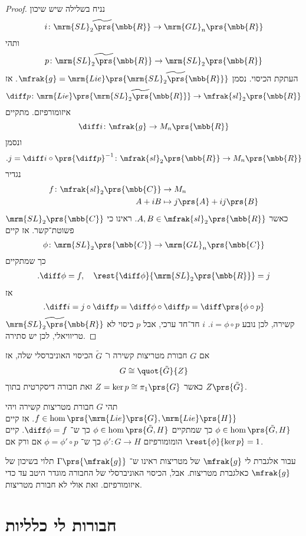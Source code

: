 \documentclass[10pt, twoside]{book}
\newcommand{\Lie}{\mrm{Lie}}
\begin{document}
\begin{proof}
נניח בשלילה שיש שיכון
\[i \colon \widetilde{\mrm{SL}_2\prs{\mbb{R}}} \to \mrm{GL}_n\prs{\mbb{R}}\]
ותהי
\[p \colon \widetilde{\mrm{SL}_2\prs{\mbb{R}}} \to \mrm{SL}_2\prs{\mbb{R}}\]
העתקת הכיסוי.
נסמן
$\mfrak{g} = \Lie\prs{\widetilde{\mrm{SL}_2\prs{\mbb{R}}}}$.
אז
\[\diff p \colon \Lie\prs{\widetilde{\mrm{SL}_2\prs{\mbb{R}}}} \to \mfrak{sl}_2\prs{\mbb{R}}\]
איזומורפיזם. מתקיים
\[\diff i \colon \mfrak{g} \to M_n\prs{\mbb{R}}\]
ונסמן
\[\text{.} j = \diff i \circ \prs{\diff p}^{-1} \colon \mfrak{sl}_2\prs{\mbb{R}} \to M_n\prs{\mbb{R}}\]
נגדיר
\begin{align*}
f \colon \mfrak{sl}_2\prs{\mbb{C}} &\to M_n \\
A + iB &\mapsto j\prs{A} + i j\prs{B}
\end{align*}
כאשר
$A,B \in \mfrak{sl}_2\prs{\mbb{R}}$.
ראינו כי
$\mrm{SL}_2\prs{\mbb{C}}$
פשוטת־קשר.
אז קיים
\[\phi \colon \mrm{SL}_2\prs{\mbb{C}} \to \mrm{GL}_n\prs{\mbb{C}}\]
כך שמתקיים
\begin{align*}
\text{.}\diff \phi = f, \quad \rest{\diff \phi}{\mrm{SL}_2\prs{\mbb{R}}} = j
\end{align*}
אז
\[\text{.}\diff i = j \circ \diff p = \diff \phi \circ \diff p = \diff \prs{\phi \circ p}\]
$\widetilde{\mrm{SL}_2\prs{\mbb{R}}}$
קשירה, לכן נובע
$i = \phi \circ p$.
$i$
חד־חד ערכי, אבל
$p$
כיסוי לא טריוויאלי, לכן יש סתירה.
\end{proof}

\begin{remark}
אם
$G$
חבורת מטריצות קשירה ו־%
$\tilde{G}$
הכיסוי האוניברסלי שלה, אז
\[G \cong \quot{\tilde{G}}{Z}\]
כאשר
$Z = \ker p \cong \pi_1\prs{G}$
זאת חבורה דיסקרטית בתוך
$Z\prs{\tilde{G}}$.
\end{remark}

\begin{fact}
תהי
$G$
חבורת מטריצות קשירה ויהי
$f \in \hom\prs{\Lie\prs{G}, \Lie\prs{H}}$.
אז קיים
$\phi \in \hom\prs{\tilde{G}, H}$
כך שמתקיים
$\phi \in \hom\prs{\tilde{G}, H}$
כך ש־%
$\diff \phi = f$.
קיים הומומורפיזם
$\phi' \colon G \to H$
כך ש־%
$\phi = \phi' \circ p$
אם ורק אם
$\rest{\phi}{\ker p} = 1$.
\end{fact}

עבור אלגברת לי
$\mfrak{g}$
של מטריצות ראינו ש־%
$\Gamma\prs{\mfrak{g}}$
תלוי בשיכון של
$\mfrak{g}$
כאלגברת מטריצות. אבל, הכיסוי האוניברסלי של החבורה מוגדר היטב עד כדי איזומורפיזם. זאת אולי לא חבורת מטריצות.

\section{חבורות לי כלליות}
\end{document}
